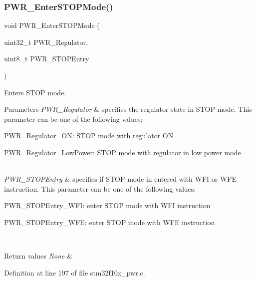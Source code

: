 \subsubsection{\texorpdfstring{P\+W\+R\+\_\+\+Enter\+S\+T\+O\+P\+Mode()}{PWR\_EnterSTOPMode()}}
{\footnotesize\ttfamily void P\+W\+R\+\_\+\+Enter\+S\+T\+O\+P\+Mode (\begin{DoxyParamCaption}\item[{uint32\+\_\+t}]{P\+W\+R\+\_\+\+Regulator,  }\item[{uint8\+\_\+t}]{P\+W\+R\+\_\+\+S\+T\+O\+P\+Entry }\end{DoxyParamCaption})}



Enters S\+T\+OP mode. 


\begin{DoxyParams}{Parameters}
{\em P\+W\+R\+\_\+\+Regulator} & specifies the regulator state in S\+T\+OP mode. This parameter can be one of the following values\+: \begin{DoxyItemize}
\item P\+W\+R\+\_\+\+Regulator\+\_\+\+ON\+: S\+T\+OP mode with regulator ON \item P\+W\+R\+\_\+\+Regulator\+\_\+\+Low\+Power\+: S\+T\+OP mode with regulator in low power mode \end{DoxyItemize}
\\
\hline
{\em P\+W\+R\+\_\+\+S\+T\+O\+P\+Entry} & specifies if S\+T\+OP mode in entered with W\+FI or W\+FE instruction. This parameter can be one of the following values\+: \begin{DoxyItemize}
\item P\+W\+R\+\_\+\+S\+T\+O\+P\+Entry\+\_\+\+W\+FI\+: enter S\+T\+OP mode with W\+FI instruction \item P\+W\+R\+\_\+\+S\+T\+O\+P\+Entry\+\_\+\+W\+FE\+: enter S\+T\+OP mode with W\+FE instruction \end{DoxyItemize}
\\
\hline
\end{DoxyParams}

\begin{DoxyRetVals}{Return values}
{\em None} & \\
\hline
\end{DoxyRetVals}


Definition at line 197 of file stm32f10x\+\_\+pwr.\+c.

\mbox{\label{group___p_w_r___exported___functions_gaa980163a4d83304280ee34942464b4ec}} 
